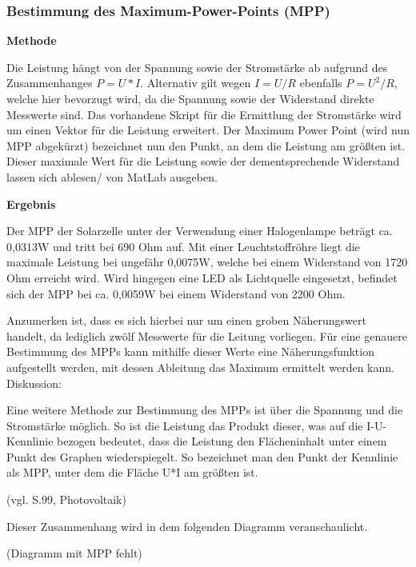     \subsubsection{Bestimmung des Maximum-Power-Points (MPP)}           %
        \textbf{Methode}
        \newline
        \par Die Leistung hängt von der Spannung sowie der Stromstärke ab aufgrund des Zusammenhanges $P=U*I$. Alternativ gilt wegen $I=U/R$ ebenfalls $P=U^2/R$, welche hier bevorzugt wird, da die Spannung sowie der Widerstand direkte Messwerte sind. Das vorhandene Skript für die Ermittlung der Stromstärke wird um einen Vektor für die Leistung erweitert.
        Der Maximum Power Point (wird nun MPP abgekürzt) bezeichnet nun den Punkt, an dem die Leistung am größten ist. Dieser maximale Wert für die Leistung sowie der dementsprechende Widerstand lassen sich ablesen/ von MatLab ausgeben. 
        
        \vspace{4mm}
        \textbf{Ergebnis}
        \par Der MPP der Solarzelle unter der Verwendung einer Halogenlampe beträgt ca. 0,0313W und tritt bei 690 Ohm auf. Mit einer Leuchtstoffröhre liegt die maximale Leistung bei ungefähr 0,0075W, welche bei einem Widerstand von 1720 Ohm erreicht wird. Wird hingegen eine LED als Lichtquelle eingesetzt, befindet sich der MPP bei ca. 0,0059W bei einem Widerstand von 2200 Ohm.
        \par Anzumerken ist, dass es sich hierbei nur um einen groben Näherungswert handelt, da lediglich zwölf Messwerte für die Leitung vorliegen. Für eine genauere Bestimmung des MPPs kann mithilfe dieser Werte eine Näherungsfunktion aufgestellt werden, mit dessen Ableitung das Maximum ermittelt werden kann. 
        Diskussion:
        \par Eine weitere Methode zur Bestimmung des MPPs ist über die Spannung und die Stromstärke möglich. So ist die Leistung das Produkt dieser, was auf die I-U-Kennlinie bezogen bedeutet, dass die Leistung den Flächeninhalt unter einem Punkt des Graphen wiederspiegelt. So bezeichnet man den Punkt der Kennlinie als MPP, unter dem die Fläche U*I am größten ist. \par (vgl. S.99, Photovoltaik)
        \par Dieser Zusammenhang wird in dem folgenden Diagramm veranschaulicht.
        \par (Diagramm mit MPP fehlt)

